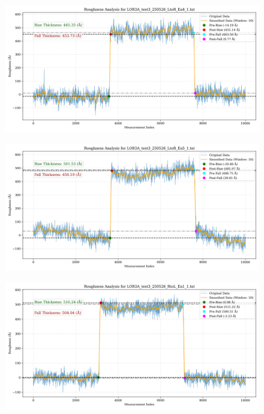 \documentclass[platex,dvipdfmx,10pt,twoside,a4paper,jis2004]{jsarticle}
\begin{document}
\begin{figure}[H]
    \centering
    \includegraphics[width=\textwidth]{LOR3A_test3_250526_LtoR_Ea4_1.png}
    \label{fig:LOR3Atest3250526LtoREa41}
\end{figure}
\begin{figure}[H]
    \centering
    \includegraphics[width=\textwidth]{LOR3A_test3_250526_LtoR_Ea5_1.png}
    \label{fig:LOR3Atest3250526LtoREa51}
\end{figure}
\begin{figure}[H]
    \centering
    \includegraphics[width=\textwidth]{LOR3A_test3_250526_RtoL_Ea1_1.png}
    \label{fig:LOR3Atest3250526RtoLEa11}
\end{figure}
\end{document}
